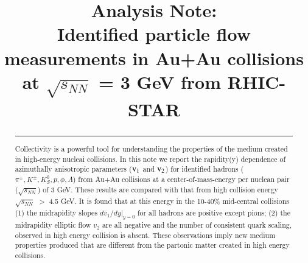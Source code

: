 \documentclass[preprint,showpacs,aps,prc,superscriptaddress]{revtex4-1}
\begin{document}
\preprint{}

\title{
\Huge{Analysis Note: \\ \textbf{Identified particle flow measurements in Au+Au collisions at $\sqrt{s_{NN}}$ = 3 GeV from RHIC-STAR}}
}


\begin{abstract}

\noindent\rule[0.25\baselineskip]{\textwidth}{1pt}
Collectivity is a powerful tool for understanding the properties of the medium created in high-energy nucleai collisions. In this note we report the rapidity(y) dependence of azimuthally anisotropic parameters ($\rm v_{1}$ and $\rm v_{2}$) for identified hadrons ($\pi^{\pm}, K^{\pm}, K_{S}^{0}, p, \phi, \Lambda$) from Au+Au collisions at a center-of-mass-energy per nuclean pair ($\sqrt{s_{NN}}$) of 3 GeV. These results are compared with that from high collision energy $\sqrt{s_{NN}}$ $>$ 4.5 GeV. It is found that at this energy in the 10-40\% mid-central collisions (1) the midrapidity slopes $dv_{1}/dy|_{y=0}$ for all hadrons are positive except pions; (2) the midrapidity elliptic flow $v_{2}$ are all negative and the number of consistent quark scaling, observed in high energy collision is absent. These observations imply new medium properties produced that are different from the partonic matter created in high energy collisions.
\end{abstract}

\maketitle
\listoffigures
\listoftables
\tableofcontents

\newpage


\linenumbers
\clearpage
\clearpage
\clearpage
\clearpage
\clearpage



\clearpage

%

%

%
\end{document}
